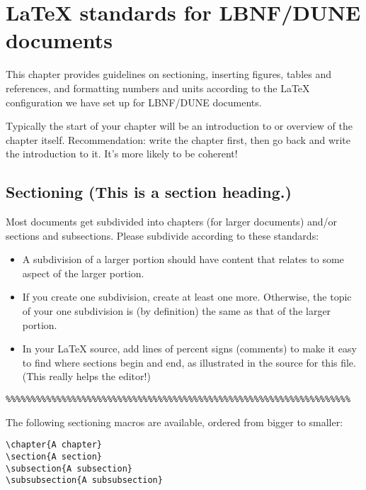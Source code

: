 
\chapter{\LaTeX{} standards for LBNF/DUNE documents}
\label{ch:latex-stds}

This chapter provides guidelines on sectioning,  inserting figures, tables and references, and formatting numbers and units according to the \LaTeX{} configuration we have set up for LBNF/DUNE documents.

Typically the start of your chapter will be an introduction to or overview of the chapter itself. Recommendation: write the chapter first, then go back and write the introduction to it. It's more likely to be coherent!

\section{Sectioning (This is a section heading.)}
\label{sec:latex-sectioning}

Most documents get subdivided into chapters (for larger documents) and/or sections and subsections. Please subdivide according to these standards:

\begin{itemize}
\item A subdivision of a larger portion should have content that relates to some aspect of the larger portion. 
\item  If you create one subdivision, create at least one more. Otherwise, the topic of your one subdivision is (by definition) the same as that of the larger portion.
\item In your \LaTeX{} source, add lines of percent signs (comments) to make it easy to find where sections begin and end, as illustrated in the source for this file. (This really helps the editor!)
\end{itemize}

\begin{verbatim}
%%%%%%%%%%%%%%%%%%%%%%%%%%%%%%%%%%%%%%%%%%%%%%%%%%%%%%%%%%%%%%%%%%%%
\end{verbatim}

The following sectioning macros are available, ordered from bigger to smaller:

\begin{verbatim}
\chapter{A chapter}
\section{A section}
\subsection{A subsection}
\subsubsection{A subsubsection}
\end{verbatim}

